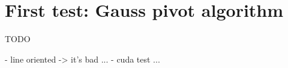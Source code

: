 
\section{First test: Gauss pivot algorithm}

TODO

- line oriented -> it's bad ...
- cuda test ...

